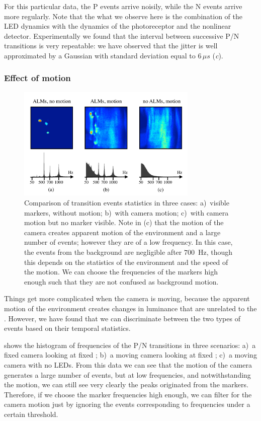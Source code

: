 For this particular data, the P events arrive noisily, while the N
events arrive more regularly. Note that the what we observe here is
the combination of the LED dynamics with the dynamics of the photoreceptor
and the nonlinear detector. Experimentally we found that the interval
between successive P/N transitions is very repeatable: we have observed
that the jitter is well approximated by a Gaussian with standard deviation
equal to $6\,\mu s$ (\emph{c}).


\subsubsection{Effect of motion\label{sub:Alternate-events-and-motion}}

\begin{figure}[b]
\centering{}\includegraphics[width=8.6cm]{figures/slides/motion}\caption{\label{fig:switch-hist}Comparison of transition events statistics
in three cases: a)~visible markers, without motion; b)~with camera
motion; c)~with camera motion but no marker visible. Note in (c)
that the motion of the camera creates apparent motion of the environment
and a large number of events; however they are of a low frequency.
In this case, the events from the background are negligible after
$700$~Hz, though this depends on the statistics of the environment
and the speed of the motion. We can choose the frequencies of the
markers high enough such that they are not confused as background
motion.}
\end{figure}


Things get more complicated when the camera is moving, because the
apparent motion of the environment creates changes in luminance that
are unrelated to the \ALMs. However, we have found that we can discriminate
between the two types of events based on their temporal statistics.

 shows the histogram of frequencies of
the P/N transitions in three scenarios: a)~a fixed camera looking
at fixed \ALMs; b)~a moving camera looking at fixed \ALMs; c)~a
moving camera with no LEDs. From this data we can see that the motion
of the camera generates a large number of events, but at low frequencies,
and notwithstanding the motion, we can still see very clearly the
peaks originated from the markers. Therefore, if we choose the marker
frequencies high enough, we can filter for the camera motion just
by ignoring the events corresponding to frequencies under a certain
threshold. 
